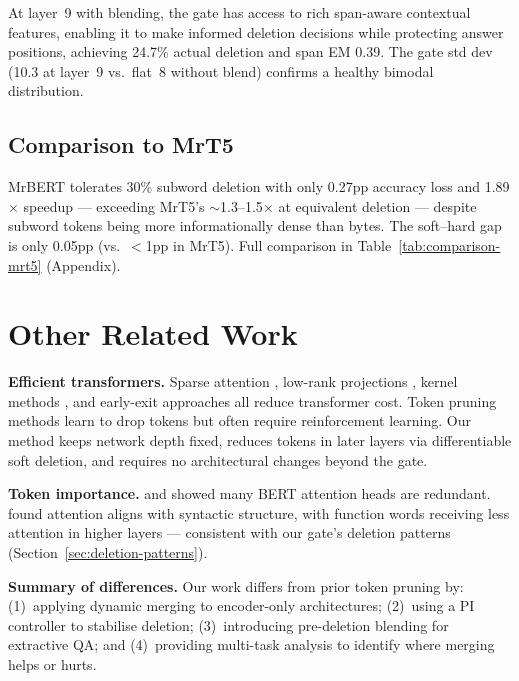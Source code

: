 \documentclass{article} %
\begin{document}
At layer~9 with blending, the gate has access to rich span-aware contextual features, enabling it to make informed deletion decisions while protecting answer positions, achieving 24.7\% actual deletion and span EM 0.39. The gate std dev (10.3 at layer~9 vs.\ flat~8 without blend) confirms a healthy bimodal distribution.


\subsection{Comparison to MrT5}

MrBERT tolerates 30\% subword deletion with only 0.27pp accuracy loss and 1.89$\times$ speedup --- exceeding MrT5's $\sim$1.3--1.5$\times$ at equivalent deletion --- despite subword tokens being more informationally dense than bytes. The soft--hard gap is only 0.05pp (vs.\ $<$1pp in MrT5). Full comparison in Table~\ref{tab:comparison-mrt5} (Appendix).

\section{Other Related Work}
\label{sec:related-work}

\textbf{Efficient transformers.} Sparse attention \citep{beltagy2020longformer,zaheer2020bigbird}, low-rank projections \citep{wang2020linformer}, kernel methods \citep{choromanski2021performer}, and early-exit approaches \citep{xin2020deebert,zhou2020pabee} all reduce transformer cost. Token pruning methods \citep{ye2021trbert,wang2021spatten,kim2022ltp} learn to drop tokens but often require reinforcement learning. Our method keeps network depth fixed, reduces tokens in later layers via differentiable soft deletion, and requires no architectural changes beyond the gate.

\textbf{Token importance.} \citet{michel2019heads} and \citet{voita2019heads} showed many BERT attention heads are redundant. \citet{clark2019attention} found attention aligns with syntactic structure, with function words receiving less attention in higher layers --- consistent with our gate's deletion patterns (Section~\ref{sec:deletion-patterns}).

\textbf{Summary of differences.} Our work differs from prior token pruning by: (1)~applying dynamic merging to encoder-only architectures; (2)~using a PI controller to stabilise deletion; (3)~introducing pre-deletion blending for extractive QA; and (4)~providing multi-task analysis to identify where merging helps or hurts.
\end{document}
